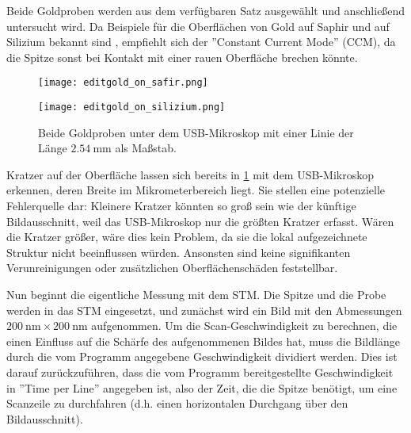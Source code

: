 

Beide Goldproben werden aus dem verfügbaren Satz ausgewählt und anschließend untersucht wird. 
Da Beispiele für die Oberflächen von Gold auf Saphir und auf Silizium bekannt sind \cite{praktikum}, empfiehlt sich der ''Constant Current Mode'' (CCM), da die Spitze sonst bei Kontakt mit einer rauen Oberfläche brechen könnte.

\begin{figure}[H]
    \centering
    \begin{minipage}[t]{0.495\textwidth}
        \centering
        \texttt{[image: editgold\_on\_safir.png]}
        \label{fig:golda}
    \end{minipage}
    \hfill
    \begin{minipage}[t]{0.495\textwidth}
        \centering
        \texttt{[image: editgold\_on\_silizium.png]}
        \label{fig:goldb}
    \end{minipage}
    \caption{Beide Goldproben unter dem USB-Mikroskop mit einer Linie der Länge $\SI{2.54}{\mm}$ als Maßstab.}
    \label{fig:gold_combined}
\end{figure}

Kratzer auf der Oberfläche lassen sich bereits in \cref{fig:gold_combined} mit dem USB-Mikroskop erkennen, deren Breite im Mikrometerbereich liegt. 
Sie stellen eine potenzielle Fehlerquelle dar: Kleinere Kratzer könnten so groß sein wie der künftige Bildausschnitt, weil das USB-Mikroskop nur die größten Kratzer erfasst. 
Wären die Kratzer größer, wäre dies kein Problem, da sie die lokal aufgezeichnete Struktur nicht beeinflussen würden. Ansonsten sind keine signifikanten Verunreinigungen oder zusätzlichen Oberflächenschäden feststellbar.

Nun beginnt die eigentliche Messung mit dem STM.
Die Spitze und die Probe werden in das STM eingesetzt, und zunächst wird ein Bild mit den Abmessungen $\SI{200}{\nm} \times \SI{200}{\nm}$ aufgenommen. 
Um die Scan-Geschwindigkeit zu berechnen, die einen Einfluss auf die Schärfe des aufgenommenen Bildes hat, muss die Bildlänge durch die vom Programm angegebene Geschwindigkeit dividiert werden. 
Dies ist darauf zurückzuführen, dass die vom Programm bereitgestellte Geschwindigkeit in ''Time per Line'' angegeben ist, also der Zeit, die die Spitze benötigt, um eine Scanzeile zu durchfahren (d.h. einen horizontalen Durchgang über den Bildausschnitt).

